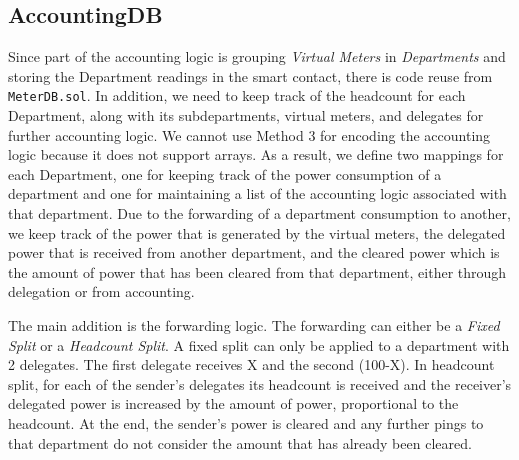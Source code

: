 


\subsection{AccountingDB}

Since part of the accounting logic is grouping \textit{Virtual Meters} in \textit{Departments} and storing the Department readings in the smart contact, there is code reuse from \texttt{MeterDB.sol}. In addition, we need to keep track of the headcount for each Department, along with its subdepartments, virtual meters, and delegates for further accounting logic. We cannot use Method 3 for encoding the accounting logic because it does not support arrays. As a result, we define two mappings for each Department, one for keeping track of the power consumption of a department and one for maintaining a list of the accounting logic associated with that department. Due to the forwarding of a department consumption to another, we keep track of the power that is generated by the virtual meters, the delegated power that is received from another department, and the cleared power which is the amount of power that has been cleared from that department, either through delegation or from accounting. 

The main addition is the forwarding logic. The forwarding can either be a \textit{Fixed Split} or a \textit{Headcount Split}. A fixed split can only be applied to a department with 2 delegates. The first delegate receives X and the second (100-X). In headcount split, for each of the sender's delegates its headcount is received and the receiver's delegated power is increased by the amount of power, proportional to the headcount. At the end, the sender's power is cleared and any further pings to that department do not consider the amount that has already been cleared. 



